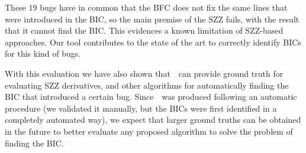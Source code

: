 These 19 bugs have in common that the BFC does not fix the same lines that were introduced in the BIC, so the main premise of the SZZ fails, with the result that it cannot find the BIC. 
This evidences a known limitation of SZZ-based approaches. 
Our tool contributes to the state of the art to correctly identify BICs for this kind of bugs. 

With this evaluation we have also shown that~\datasetName~can provide ground truth for evaluating SZZ derivatives, and other algorithms for automatically finding the BIC that introduced a certain bug. Since~\datasetName~was produced following an automatic procedure (we validated it manually, but the BICs were first identified in a completely automated way), we expect that larger ground truths can be obtained in the future to better evaluate any proposed algorithm to solve the problem of finding the BIC.



